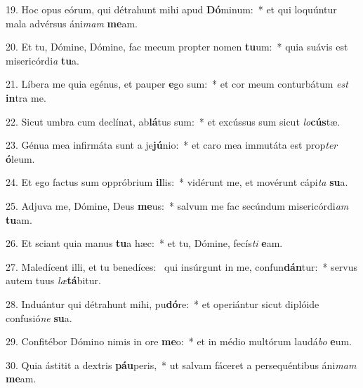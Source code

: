 19. Hoc opus eórum, qui détrahunt mihi apud \textbf{Dó}minum:~*  et qui loquúntur mala advérsus áni\textit{mam} \textbf{me}am.\

20. Et tu, Dómine, Dómine, fac mecum propter nomen \textbf{tu}um:~*  quia suávis est misericórdi\textit{a} \textbf{tu}a.\

21. Líbera me quia egénus, et pauper \textbf{e}go sum:~*  et cor meum conturbátum \textit{est} \textbf{in}tra me.\

22. Sicut umbra cum declínat, ab\textbf{lá}tus sum:~*  et excússus sum sicut \textit{lo}\textbf{cús}tæ.\

23. Génua mea infirmáta sunt a je\textbf{jú}nio:~*  et caro mea immutáta est prop\textit{ter} \textbf{ó}leum.\

24. Et ego factus sum oppróbrium \textbf{il}lis:~*  vidérunt me, et movérunt cápi\textit{ta} \textbf{su}a.\

25. Adjuva me, Dómine, Deus \textbf{me}us:~*  salvum me fac secúndum misericórdi\textit{am} \textbf{tu}am.\

26. Et sciant quia manus \textbf{tu}a hæc:~*  et tu, Dómine, fecís\textit{ti} \textbf{e}am.\

27. Maledícent illi, et tu benedíces: \dag\  qui insúrgunt in me, confun\textbf{dán}tur:~*  servus autem tuus \textit{læ}\textbf{tá}bitur.\

28. Induántur qui détrahunt mihi, pu\textbf{dó}re:~*  et operiántur sicut diplóide confusió\textit{ne} \textbf{su}a.\

29. Confitébor Dómino nimis in ore \textbf{me}o:~*  et in médio multórum laudá\textit{bo} \textbf{e}um.\

30. Quia ástitit a dextris \textbf{páu}peris,~*  ut salvam fáceret a persequéntibus áni\textit{mam} \textbf{me}am.\

